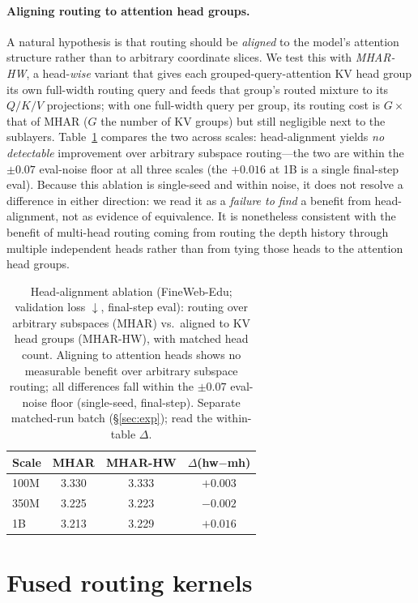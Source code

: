 \documentclass{article}
\begin{document}
\paragraph{Aligning routing to attention head groups.}
A natural hypothesis is that routing should be \emph{aligned} to the model's
attention structure rather than to arbitrary coordinate slices. We test this with
\emph{MHAR-HW}, a head-\emph{wise} variant that gives each grouped-query-attention
KV head group its own full-width routing query and feeds that group's routed
mixture to its $Q/K/V$ projections; with one full-width query per group, its
routing cost is $G\times$ that of MHAR ($G$ the number of KV groups) but still
negligible next to the sublayers. Table~\ref{tab:headalign} compares the two across scales:
head-alignment yields \emph{no detectable} improvement over arbitrary subspace
routing---the two are within the $\pm0.07$ eval-noise floor at all three scales (the
$+0.016$ at 1B is a single final-step eval). Because this ablation is single-seed and
within noise, it does not resolve a difference in either direction: we read it as a
\emph{failure to find} a benefit from head-alignment, not as evidence of equivalence.
It is nonetheless consistent with the benefit of multi-head routing coming from
routing the depth history through multiple independent heads rather than from tying
those heads to the attention head groups.

\begin{table}[h]
\centering
\caption{Head-alignment ablation (FineWeb-Edu; validation loss $\downarrow$, final-step eval):
routing over arbitrary subspaces (MHAR) vs.\ aligned to KV head groups
(MHAR-HW), with matched head count. Aligning to attention heads shows no measurable
benefit over arbitrary subspace routing; all differences fall within the $\pm0.07$
eval-noise floor (single-seed, final-step). Separate matched-run batch (\S\ref{sec:exp}); read the within-table $\Delta$.}
\label{tab:headalign}
\begin{tabular}{lccc}
\toprule
\textbf{Scale} & \textbf{MHAR} & \textbf{MHAR-HW} & \textbf{$\Delta$(hw$-$mh)} \\
\midrule
100M & 3.330 & 3.333 & $+0.003$ \\
350M & 3.225 & 3.223 & $-0.002$ \\
1B   & 3.213 & 3.229 & $+0.016$ \\
\bottomrule
\end{tabular}
\end{table}

\section{Fused routing kernels}
\label{sec:kernel}
\end{document}
